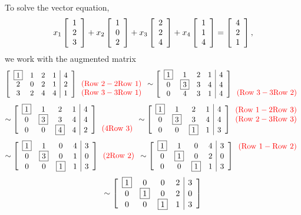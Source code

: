 \begin{Exam}
To solve the vector equation,
\[x_1\vr{1\\2\\3}+x_2\vr{1\\0\\2} + x_3\vr{2\\2\\4}+ x_4\vr{1\\1\\4} = \vr{4\\2\\1},\] we work with the augmented matrix
\[\mtx{cccc|c}{\fbox{1}&1&2&1&4 \\  2&0&2&1&2\\ 3&2&4&4&1}{\color{red} \begin{array}{c} \mbox{}\\  (\text{Row 2} - 2\text{Row 1}) \\ (\text{Row 3} - 3\text{Row 1}) \end{array}} 
\sim \mtx{cccc|c}{\fbox{1}&1&2&1&4 \\  0&\fbox{3}&3&4&4\\ 0&4&3&1&4}{\color{red} \begin{array}{c} \mbox{}\\  \mbox{} \\ (\text{Row 3} - 3\text{Row 2}) \end{array}}\]
\[\sim \mtx{cccc|c}{\fbox{1}&1&2&1&4 \\  0&\fbox{3}&3&4&4\\ 0&0&\fbox{4}&4&2}{\color{red} \begin{array}{c} \mbox{}\\  \mbox{} \\ (4\text{Row 3}) \end{array}}
\sim \mtx{cccc|c}{\fbox{1}&1&2&1&4 \\  0&\fbox{3}&3&4&4\\ 0&0&\fbox{1}&1&3}{\color{red} \begin{array}{c} (\text{Row 1} -2\text{Row 3})\\  (\text{Row 2} -3\text{Row 3}) \\ \mbox{} \end{array}}\]
\[\sim \mtx{cccc|c}{\fbox{1}&1&0&4&3 \\  0&\fbox{3}&0&1&0\\ 0&0&\fbox{1}&1&3}{\color{red} \begin{array}{c} \mbox{}\\  (2\text{Row 2}) \\ \mbox{} \end{array}}
\sim \mtx{cccc|c}{\fbox{1}&1&0&4&3 \\  0&\fbox{1}&0&2&0\\ 0&0&\fbox{1}&1&3}{\color{red} \begin{array}{c} (\text{Row 1} -\text{Row 2})\\  \mbox{} \\ \mbox{} \end{array}}\]
\[\sim \mtx{cccc|c}{\fbox{1}&0&0&2&3 \\  0&\fbox{1}&0&2&0\\ 0&0&\fbox{1}&1&3}\]


\end{Exam}
